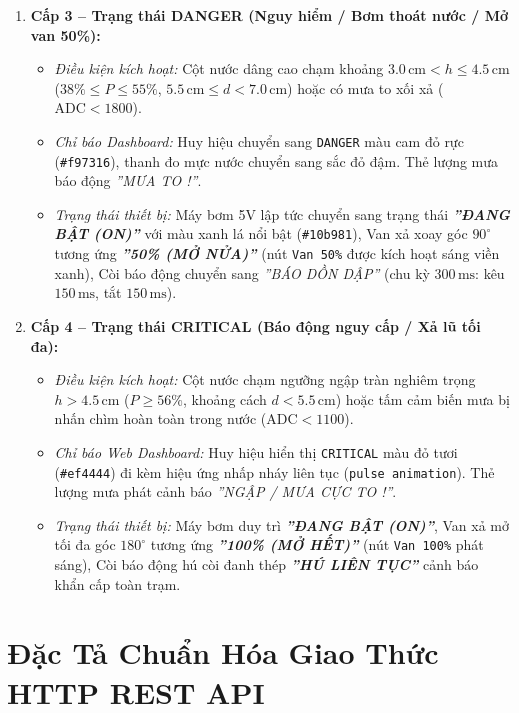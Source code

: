 \begin{enumerate}
    \item \textbf{Cấp 3 -- Trạng thái DANGER (Nguy hiểm / Bơm thoát nước / Mở van 50\%):}
    \begin{itemize}
        \item \textit{Điều kiện kích hoạt:} Cột nước dâng cao chạm khoảng $3.0\,\text{cm} < h \le 4.5\,\text{cm}$ ($38\% \le P \le 55\%$, $5.5\,\text{cm} \le d < 7.0\,\text{cm}$) hoặc có mưa to xối xả ($\text{ADC} < 1800$).
        \item \textit{Chỉ báo Dashboard:} Huy hiệu chuyển sang \texttt{DANGER} màu cam đỏ rực (\texttt{\#f97316}), thanh đo mực nước chuyển sang sắc đỏ đậm. Thẻ lượng mưa báo động \textit{''MƯA TO !''}.
        \item \textit{Trạng thái thiết bị:} Máy bơm 5V lập tức chuyển sang trạng thái \textbf{\textit{''ĐANG BẬT (ON)''}} với màu xanh lá nổi bật (\texttt{\#10b981}), Van xả xoay góc $90^\circ$ tương ứng \textbf{\textit{''50\% (MỞ NỬA)''}} (nút \texttt{Van 50\%} được kích hoạt sáng viền xanh), Còi báo động chuyển sang \textit{''BÁO DỒN DẬP''} (chu kỳ $300\,\text{ms}$: kêu $150\,\text{ms}$, tắt $150\,\text{ms}$).
    \end{itemize}

    \item \textbf{Cấp 4 -- Trạng thái CRITICAL (Báo động nguy cấp / Xả lũ tối đa):}
    \begin{itemize}
        \item \textit{Điều kiện kích hoạt:} Cột nước chạm ngưỡng ngập tràn nghiêm trọng $h > 4.5\,\text{cm}$ ($P \ge 56\%$, khoảng cách $d < 5.5\,\text{cm}$) hoặc tấm cảm biến mưa bị nhấn chìm hoàn toàn trong nước ($\text{ADC} < 1100$).
        \item \textit{Chỉ báo Web Dashboard:} Huy hiệu hiển thị \texttt{CRITICAL} màu đỏ tươi (\texttt{\#ef4444}) đi kèm hiệu ứng nhấp nháy liên tục (\texttt{pulse animation}). Thẻ lượng mưa phát cảnh báo \textit{''NGẬP / MƯA CỰC TO !''}.
        \item \textit{Trạng thái thiết bị:} Máy bơm duy trì \textbf{\textit{''ĐANG BẬT (ON)''}}, Van xả mở tối đa góc $180^\circ$ tương ứng \textbf{\textit{''100\% (MỞ HẾT)''}} (nút \texttt{Van 100\%} phát sáng), Còi báo động hú còi đanh thép \textbf{\textit{''HÚ LIÊN TỤC''}} cảnh báo khẩn cấp toàn trạm.
    \end{itemize}
\end{enumerate}

\section{Đặc Tả Chuẩn Hóa Giao Thức HTTP REST API}

